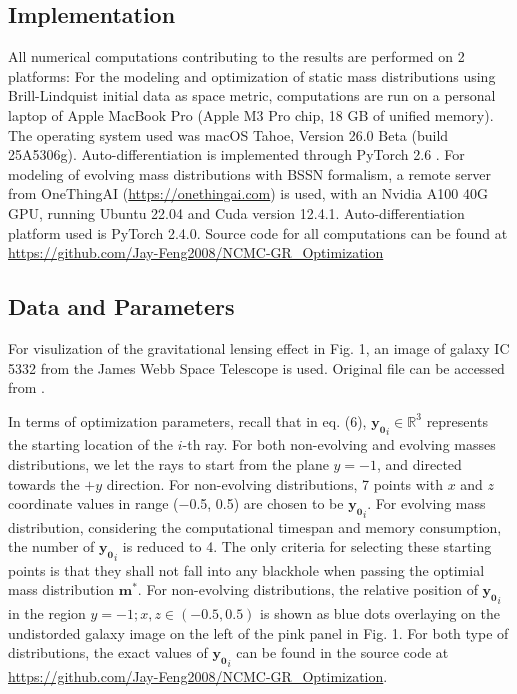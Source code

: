 \documentclass[conference]{IEEEtran}
\begin{document}
\subsection{Implementation}
All numerical computations contributing to the results are performed 
on 2 platforms: For the modeling and optimization of static mass distributions 
using Brill-Lindquist initial data as space metric, computations are 
run on a personal laptop of Apple MacBook Pro (Apple M3 Pro chip, 18 GB of unified memory).
The operating system used was macOS Tahoe, Version 26.0 Beta (build 25A5306g). 
Auto-differentiation is implemented through PyTorch 2.6 \cite{torch}. 
For modeling of evolving mass distributions with BSSN formalism, a remote server 
from OneThingAI (\url{https://onethingai.com}) is used, with an Nvidia A100 40G 
GPU, running Ubuntu 22.04 and Cuda version 12.4.1. Auto-differentiation 
platform used is PyTorch 2.4.0. Source code for all computations can be found at \url{https://github.com/Jay-Feng2008/NCMC-GR_Optimization}



\subsection{Data and Parameters}
For visulization of the gravitational lensing effect in 
Fig. 1, an image of galaxy IC 5332 from the James Webb Space Telescope 
is used. Original file can be accessed from \cite{JWST}. 

In terms of optimization parameters, recall that in eq. (6), 
$\mathbf{y_0}_i \in \mathbb{R}^3$ represents the starting location of 
the $i$-th ray. For both non-evolving and evolving masses distributions, 
we let the rays to start from the plane $y = -1$, and directed towards the 
$+y$ direction. For non-evolving distributions, 7 points with $x$ and $z$ 
coordinate values in range ($-$0.5, 0.5) are chosen to be $\mathbf{y_0}_i$.
For evolving mass distribution, considering the computational timespan and 
memory consumption, the number of $\mathbf{y_0}_i$ is reduced to 4. The only 
criteria for selecting these starting points is that they shall not fall 
into any blackhole when passing the optimial mass distribution $\mathbf{m}^*$. 
For non-evolving distributions, the relative position of $\mathbf{y_0}_i$ in 
the region $y=-1; x, z \in (-0.5, 0.5)$ is shown as blue dots overlaying on 
the undistorded galaxy image on the left of the pink panel in Fig. 1. For both 
type of distributions, the exact values of $\mathbf{y_0}_i$ can be found in the 
source code at \url{https://github.com/Jay-Feng2008/NCMC-GR_Optimization}.
\end{document}
